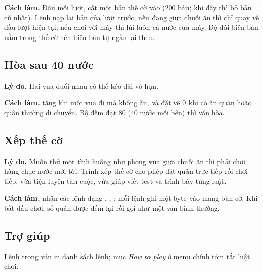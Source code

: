 \textbf{Cách làm.} Đầu mỗi lượt,  cất một bản thế cờ vào  (200 bản; khi đầy thì bỏ bản cũ nhất). Lệnh  nạp lại bản của lượt trước; nếu đang giữa chuỗi ăn thì chỉ quay về đầu lượt hiện tại; nếu chơi với máy thì lùi luôn cả nước của máy. Độ dài biên bản nằm trong thế cờ nên biên bản tự ngắn lại theo.

\subsection{Hòa sau 40 nước}

\textbf{Lý do.} Hai vua đuổi nhau có thể kéo dài vô hạn.

\textbf{Cách làm.}  tăng  khi một vua đi mà không ăn, và đặt về 0 khi có ăn quân hoặc quân thường di chuyển. Bộ đếm đạt 80 (40 nước mỗi bên) thì ván hòa.

\subsection{Xếp thế cờ}

\textbf{Lý do.} Muốn thử một tình huống như phong vua giữa chuỗi ăn thì phải chơi hàng chục nước mới tới. Trình xếp thế cờ cho phép đặt quân trực tiếp rồi chơi tiếp, vừa tiện luyện tàn cuộc, vừa giúp viết test và trình bày từng luật.

\textbf{Cách làm.}  nhận các lệnh dạng , , ; mỗi lệnh ghi một byte vào mảng bàn cờ. Khi bắt đầu chơi, số quân được đếm lại rồi gọi  như một ván bình thường.

\subsection{Trợ giúp}

Lệnh  trong ván in danh sách lệnh; mục \emph{How to play} ở menu chính tóm tắt luật chơi.
